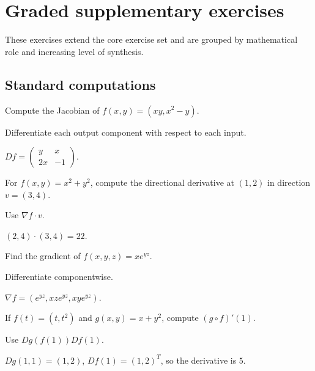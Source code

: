 \section{Graded supplementary exercises}
These exercises extend the core exercise set and are grouped by mathematical role and increasing level of synthesis.

\subsection*{Standard computations}

\begin{exercise}[Jacobian]\label{exr:ii08-expand-01}
Compute the Jacobian of \(f(x,y)=(xy,x^2-y)\).
\end{exercise}
\begin{hint}
Differentiate each output component with respect to each input.
\end{hint}
\begin{solution}
\(Df=\begin{pmatrix}y&x\\2x&-1\end{pmatrix}\).
\end{solution}

\begin{exercise}\label{exr:ii08-expand-02}
For \(f(x,y)=x^2+y^2\), compute the directional derivative at \((1,2)\) in direction \(v=(3,4)\).
\end{exercise}
\begin{hint}
Use \(\nabla f\cdot v\).
\end{hint}
\begin{solution}
\((2,4)\cdot(3,4)=22\).
\end{solution}

\begin{exercise}[Gradient]\label{exr:ii08-expand-03}
Find the gradient of \(f(x,y,z)=xe^{yz}\).
\end{exercise}
\begin{hint}
Differentiate componentwise.
\end{hint}
\begin{solution}
\(\nabla f=(e^{yz},xz e^{yz},xy e^{yz})\).
\end{solution}

\begin{exercise}\label{exr:ii08-expand-04}
If \(f(t)=(t,t^2)\) and \(g(x,y)=x+y^2\), compute \((g\circ f)'(1)\).
\end{exercise}
\begin{hint}
Use \(Dg(f(1))Df(1)\).
\end{hint}
\begin{solution}
\(Dg(1,1)=(1,2)\), \(Df(1)=(1,2)^T\), so the derivative is \(5\).
\end{solution}

